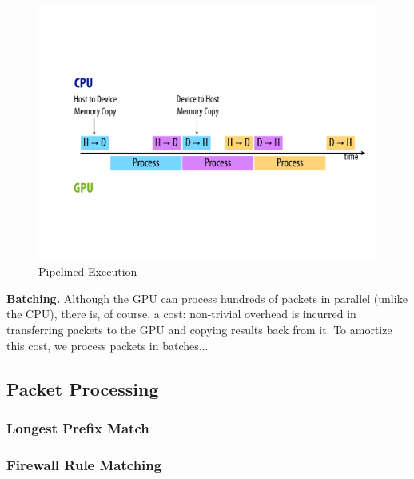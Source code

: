 \begin{figure}
   \centering
   \includegraphics[scale=0.25]{figs/pipelining.pdf}
   \caption{Pipelined Execution}
   \label{fig:pipelining}
\end{figure}

\noindent \textbf{Batching.} Although the GPU can process hundreds of packets
in parallel (unlike the CPU), there is, of course, a cost: non-trivial overhead
is incurred in transferring packets to the GPU and copying results back from
it. To amortize this cost, we process packets in batches...

\subsection{Packet Processing}

\subsubsection{Longest Prefix Match}

\subsubsection{Firewall Rule Matching}
